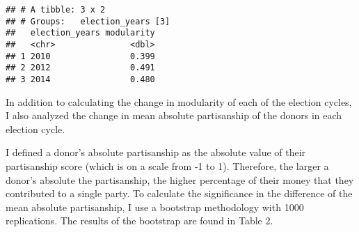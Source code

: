 \documentclass[11pt,]{article}
\newenvironment{Shaded}{\begin{snugshade}}{\end{snugshade}}
\newcommand{\DataTypeTok}[1]{\textcolor[rgb]{0.13,0.29,0.53}{#1}}
\newcommand{\KeywordTok}[1]{\textcolor[rgb]{0.13,0.29,0.53}{\textbf{#1}}}
\newcommand{\NormalTok}[1]{#1}
\newcommand{\OperatorTok}[1]{\textcolor[rgb]{0.81,0.36,0.00}{\textbf{#1}}}
\newcommand{\StringTok}[1]{\textcolor[rgb]{0.31,0.60,0.02}{#1}}
\begin{document}
\begin{Shaded}
\end{Shaded}

\begin{Shaded}
\end{Shaded}

\begin{verbatim}
## # A tibble: 3 x 2
## # Groups:   election_years [3]
##   election_years modularity
##   <chr>               <dbl>
## 1 2010                0.399
## 2 2012                0.491
## 3 2014                0.480
\end{verbatim}

In addition to calculating the change in modularity of each of the
election cycles, I also analyzed the change in mean absolute
partisanship of the donors in each election cycle.

I defined a donor's absolute partisanship as the absolute value of their
partisanship score (which is on a scale from -1 to 1). Therefore, the
larger a donor's absolute the partisanship, the higher percentage of
their money that they contributed to a single party. To calculate the
significance in the difference of the mean absolute partisanship, I use
a bootstrap methodology with 1000 replications. The results of the
bootstrap are found in Table 2.
\end{document}
